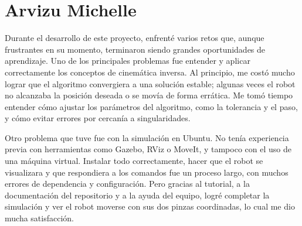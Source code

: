 \section{Arvizu Michelle}
Durante el desarrollo de este proyecto, enfrenté varios retos que, aunque frustrantes en su momento, terminaron siendo grandes oportunidades de aprendizaje. Uno de los principales problemas fue entender y aplicar correctamente los conceptos de cinemática inversa. Al principio, me costó mucho lograr que el algoritmo convergiera a una solución estable; algunas veces el robot no alcanzaba la posición deseada o se movía de forma errática. Me tomó tiempo entender cómo ajustar los parámetros del algoritmo, como la tolerancia y el paso, y cómo evitar errores por cercanía a singularidades.

Otro problema que tuve fue con la simulación en Ubuntu. No tenía experiencia previa con herramientas como Gazebo, RViz o MoveIt, y tampoco con el uso de una máquina virtual. Instalar todo correctamente, hacer que el robot se visualizara y que respondiera a los comandos fue un proceso largo, con muchos errores de dependencia y configuración. Pero gracias al tutorial, a la documentación del repositorio y a la ayuda del equipo, logré completar la simulación y ver el robot moverse con sus dos pinzas coordinadas, lo cual me dio mucha satisfacción.